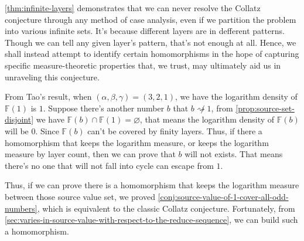 \cref{thm:infinite-layers} demonstrates that we can never resolve the Collatz conjecture through any method of case analysis, even if we partition the problem into various infinite sets.
It's because different layers are in defferent patterns. Though we can tell any given layer's pattern, that's not enough at all.
Hence, we shall instead attempt to identify certain homomorphisms in the hope of capturing specific measure-theoretic properties that, we trust, may ultimately aid us in unraveling this conjecture.

From Tao's result\cite{tao2022orbitscollatzmapattain}, when $(\alpha, \beta, \gamma) = (3, 2, 1)$, we have the logarithm density of $\mathbb{F}(1)$ is $1$.
Suppose there's another number $b$ that $b \not\rightsquigarrow 1$, from \cref{prop:source-set-disjoint} we have $\mathbb{F}(b)\cap\mathbb{F}(1) = \varnothing$, that means the logarithm density of $\mathbb{F}(b)$ will be $0$.
Since $\mathbb{F}(b)$ can't be covered by finity layers.
Thus, if there a homomorphism that keeps the logarithm measure, or keeps the logarithm measure by layer count, then we can prove that $b$ will not exists. That means there's no one that will not fall into cycle can escape from $1$.

Thus, if we can prove there is a homomorphism that keeps the logarithm measure between those source value set, we proved \cref{conj:source-value-of-1-cover-all-odd-numbers}, which is equivalent to the classic Collatz conjecture.
Fortunately, from \cref{sec:varies-in-source-value-with-respect-to-the-reduce-sequence}, we can build such a homomorphism.

